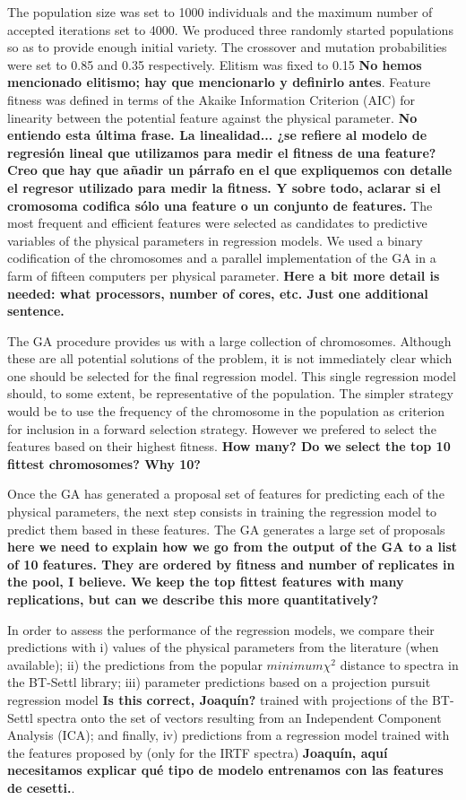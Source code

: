 The population size was set to 1000 individuals and the maximum number
of accepted iterations set to 4000. We produced three randomly started
populations so as to provide enough initial variety. The crossover and
mutation probabilities were set to 0.85 and 0.35 respectively. Elitism
was fixed to 0.15 {\bf No hemos mencionado elitismo; hay que
mencionarlo y definirlo antes}.  Feature fitness was defined in terms
of the Akaike Information Criterion (AIC) for linearity between the
potential feature against the physical parameter. {\bf No entiendo
esta última frase. La linealidad... ¿se refiere al modelo de regresión
lineal que utilizamos para medir el fitness de una feature? Creo que
hay que añadir un párrafo en el que expliquemos con detalle el
regresor utilizado para medir la fitness. Y sobre todo, aclarar si el
cromosoma codifica sólo una feature o un conjunto de features.} The
most frequent and efficient features were selected as candidates to
predictive variables of the physical parameters in regression
models. We used a binary codification of the chromosomes and a
parallel implementation of the GA in a farm of fifteen computers per
physical parameter. {\bf Here a bit more detail is needed: what
processors, number of cores, etc. Just one additional sentence.}

The GA procedure provides us with a large collection of chromosomes.
Although these are all potential solutions of the problem, it is not
immediately clear which one should be selected for the final
regression model.  This single regression model should, to some
extent, be representative of the population. The simpler strategy
would be to use the frequency of the chromosome in the population as
criterion for inclusion in a forward selection strategy. However we
prefered to select the features based on their highest fitness. {\bf
How many? Do we select the top 10 fittest chromosomes? Why 10?}

Once the GA has generated a proposal set of features for predicting
each of the physical parameters, the next step consists in training
the regression model to predict them based in these features.  The GA
generates a large set of proposals {\bf here we need to explain how we
go from the output of the GA to a list of 10 features. They are
ordered by fitness and number of replicates in the pool, I believe. We
keep the top fittest features with many replications, but can we
describe this more quantitatively?}

In order to assess the performance of the regression models, we
compare their predictions with i) values of the physical parameters
from the literature (when available); ii) the predictions from the
popular $minimum \chi^2$ distance to spectra in the BT-Settl library;
iii) parameter predictions based on a projection pursuit regression
model {\bf Is this correct, Joaquín?} trained with projections of the
BT-Settl spectra onto the set of vectors resulting from an Independent
Component Analysis (ICA); and finally, iv) predictions from a
regression model trained with the features proposed by \cite{cesetti}
(only for the IRTF spectra) {\bf Joaquín, aquí necesitamos explicar
qué tipo de modelo entrenamos con las features de cesetti.}.

